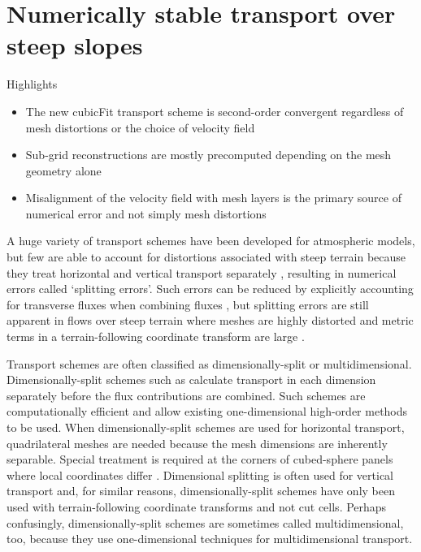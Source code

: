 \chapter{Numerically stable transport over steep slopes}
\label{ch:cubicFit}

\begin{highlights}
{\Large Highlights}
\begin{itemize}
	\item The new cubicFit transport scheme is second-order convergent regardless of mesh distortions or the choice of velocity field
	\item Sub-grid reconstructions are mostly precomputed depending on the mesh geometry alone
	\item Misalignment of the velocity field with mesh layers is the primary source of numerical error and not simply mesh distortions
\end{itemize}
\end{highlights}

A huge variety of transport schemes have been developed for atmospheric models, but few are able to account for distortions associated with steep terrain because they treat horizontal and vertical transport separately \citep{kent2014}, resulting in numerical errors called `splitting errors'.
Such errors can be reduced by explicitly accounting for transverse fluxes when combining fluxes \citep{leonard1996}, but splitting errors are still apparent in flows over steep terrain where meshes are highly distorted and metric terms in a terrain-following coordinate transform are large \citep{chen2017}.

Transport schemes are often classified as dimensionally-split or multidimensional.
Dimension\-ally-split schemes such as \citet{lin-rood1996,guo2014} calculate transport in each dimension separately before the flux contributions are combined.  Such schemes are computationally efficient and allow existing one-dimensional high-order methods to be used.
When dimensionally-split schemes are used for horizontal transport, quadrilateral meshes are needed because the mesh dimensions are inherently separable.  Special treatment is required at the corners of cubed-sphere panels where local coordinates differ \citep{putman-lin2007,guo2014}.
Dimensional splitting is often used for vertical transport and, for similar reasons, dimensionally-split schemes have only been used with terrain-following coordinate transforms and not cut cells.
Perhaps confusingly, dimensionally-split schemes are sometimes called multidimensional, too, because they use one-dimensional techniques for multidimensional transport.

